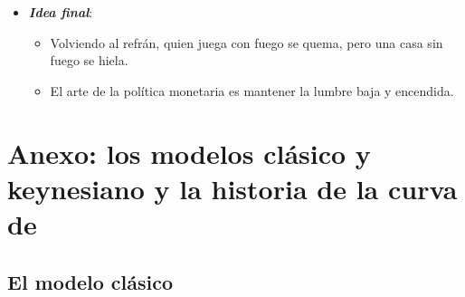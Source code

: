 \documentclass[11pt]{article}
\begin{document}
\begin{itemize}
\begin{itemize}
  \item Pero solo puede cumplir si es creíble y si la política fiscal es sostenible; si no, el dinero acaba pagando el déficit .
  \end{itemize}
\item \textbf{\emph{Idea final}}:
  \begin{itemize}
  \item Volviendo al refrán, quien juega con fuego se quema, pero una casa sin fuego se hiela.

  \item El arte de la política monetaria es mantener la lumbre baja y encendida.
  \end{itemize}
\end{itemize}

\clearpage
\appendix

\section{Anexo: los modelos clásico y keynesiano\cortetitulo{} y la historia de la curva de }\label{anexo:clasico-keynesiano}

\subsection{El modelo clásico}\label{anexo:clasico}
\end{document}
